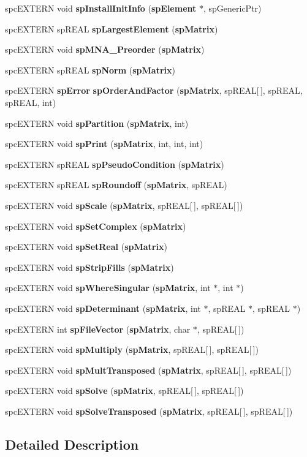 \begin{CompactItemize}
\item 
spc\-EXTERN void {\bf sp\-Install\-Init\-Info} ({\bf sp\-Element} $\ast$, sp\-Generic\-Ptr)
\item 
spc\-EXTERN sp\-REAL {\bf sp\-Largest\-Element} ({\bf sp\-Matrix})
\item 
spc\-EXTERN void {\bf sp\-MNA\_\-Preorder} ({\bf sp\-Matrix})
\item 
spc\-EXTERN sp\-REAL {\bf sp\-Norm} ({\bf sp\-Matrix})
\item 
spc\-EXTERN {\bf sp\-Error} {\bf sp\-Order\-And\-Factor} ({\bf sp\-Matrix}, sp\-REAL[$\,$], sp\-REAL, sp\-REAL, int)
\item 
spc\-EXTERN void {\bf sp\-Partition} ({\bf sp\-Matrix}, int)
\item 
spc\-EXTERN void {\bf sp\-Print} ({\bf sp\-Matrix}, int, int, int)
\item 
spc\-EXTERN sp\-REAL {\bf sp\-Pseudo\-Condition} ({\bf sp\-Matrix})
\item 
spc\-EXTERN sp\-REAL {\bf sp\-Roundoff} ({\bf sp\-Matrix}, sp\-REAL)
\item 
spc\-EXTERN void {\bf sp\-Scale} ({\bf sp\-Matrix}, sp\-REAL[$\,$], sp\-REAL[$\,$])
\item 
spc\-EXTERN void {\bf sp\-Set\-Complex} ({\bf sp\-Matrix})
\item 
spc\-EXTERN void {\bf sp\-Set\-Real} ({\bf sp\-Matrix})
\item 
spc\-EXTERN void {\bf sp\-Strip\-Fills} ({\bf sp\-Matrix})
\item 
spc\-EXTERN void {\bf sp\-Where\-Singular} ({\bf sp\-Matrix}, int $\ast$, int $\ast$)
\item 
spc\-EXTERN void {\bf sp\-Determinant} ({\bf sp\-Matrix}, int $\ast$, sp\-REAL $\ast$, sp\-REAL $\ast$)
\item 
spc\-EXTERN int {\bf sp\-File\-Vector} ({\bf sp\-Matrix}, char $\ast$, sp\-REAL[$\,$])
\item 
spc\-EXTERN void {\bf sp\-Multiply} ({\bf sp\-Matrix}, sp\-REAL[$\,$], sp\-REAL[$\,$])
\item 
spc\-EXTERN void {\bf sp\-Mult\-Transposed} ({\bf sp\-Matrix}, sp\-REAL[$\,$], sp\-REAL[$\,$])
\item 
spc\-EXTERN void {\bf sp\-Solve} ({\bf sp\-Matrix}, sp\-REAL[$\,$], sp\-REAL[$\,$])
\item 
spc\-EXTERN void {\bf sp\-Solve\-Transposed} ({\bf sp\-Matrix}, sp\-REAL[$\,$], sp\-REAL[$\,$])
\end{CompactItemize}


\subsection{Detailed Description}


